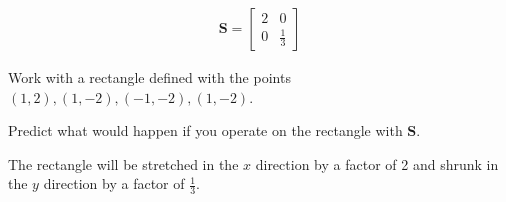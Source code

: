 \begin{align*}
    \boldsymbol{S} = \begin{bmatrix}
        2 & 0 \\
        0 & \frac{1}{3}
    \end{bmatrix}
\end{align*}

Work with a rectangle defined with the points $\left(1, 2\right), \left(1, -2\right), \left(-1, -2\right), \left(1, -2\right)$.

Predict what would happen if you operate on the rectangle with $\boldsymbol{S}$.

\begin{solution}
    The rectangle will be stretched in the $x$ direction by a factor of 2 and shrunk in the $y$ direction by a factor of $\frac{1}{3}$.
\end{solution}